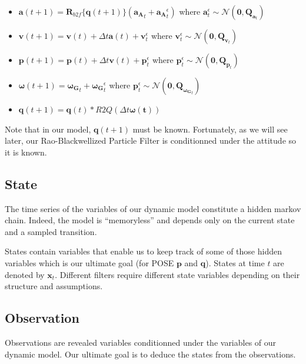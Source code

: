 \documentclass[12pt,]{article}
\providecommand{\tightlist}{%
  \setlength{\itemsep}{0pt}\setlength{\parskip}{0pt}}
\begin{document}
\begin{itemize}
\tightlist
\item
  \(\mathbf{a}(t+1) = \mathbf{R}_{b2f}\{\mathbf{q}(t+1)\}(\mathbf{a_A}_t + \mathbf{a_A}^\epsilon_t)\)
  where
  \(\mathbf{a}^\epsilon_t \sim \mathcal{N}(\mathbf{0}, \mathbf{Q}_{\mathbf{a}_t })\)
\item
  \(\mathbf{v}(t+1) = \mathbf{v}(t) + \Delta t \mathbf{a}(t) + \mathbf{v}^\epsilon_t\)
  where
  \(\mathbf{v}^\epsilon_t \sim \mathcal{N}(\mathbf{0}, \mathbf{Q}_{\mathbf{v}_t })\)
\item
  \(\mathbf{p}(t+1) = \mathbf{p}(t) + \Delta t \mathbf{v}(t) + \mathbf{p}^\epsilon_t\)
  where
  \(\mathbf{p}^\epsilon_t \sim \mathcal{N}(\mathbf{0}, \mathbf{Q}_{\mathbf{p}_t })\)
\item
  \(\boldsymbol{\omega}(t+1) = \mathbf{\boldsymbol{\omega}_G}_t + \mathbf{\boldsymbol{\omega}_G}^\epsilon_t\)
  where
  \(\mathbf{p}^\epsilon_t \sim \mathcal{N}(\mathbf{0}, \mathbf{Q}_{\mathbf{\boldsymbol{\omega}_G}_t })\)
\item
  \(\mathbf{q}(t+1) = \mathbf{q}(t)*R2Q(\Delta t \boldsymbol{ \omega(t) })\)
\end{itemize}

Note that in our model, \(\mathbf{q}(t+1)\) must be known. Fortunately,
as we will see later, our Rao-Blackwellized Particle Filter is
conditionned under the attitude so it is known.

\subsection{State}\label{state}

The time series of the variables of our dynamic model constitute a
hidden markov chain. Indeed, the model is ``memoryless'' and depends
only on the current state and a sampled transition.

States contain variables that enable us to keep track of some of those
hidden variables which is our ultimate goal (for POSE \(\mathbf{p}\) and
\(\mathbf{q}\)). States at time \(t\) are denoted by \(\mathbf{x}_t\).
Different filters require different state variables depending on their
structure and assumptions.

\subsection{Observation}\label{observation}

Observations are revealed variables conditionned under the variables of
our dynamic model. Our ultimate goal is to deduce the states from the
observations.
\end{document}
